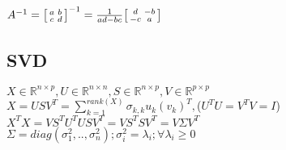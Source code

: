 $A^{-1}=
\begin{bsmallmatrix}
a&b \\ 
c&d
\end{bsmallmatrix}^{-1}=\frac{1}{ad-bc}
\begin{bsmallmatrix}
d&-b \\ 
-c&a
\end{bsmallmatrix}
$

\subsection*{SVD}
$X\in \mathbb{R}^{n\times p}, U\in \mathbb{R}^{n\times n}, S\in \mathbb{R}^{n\times p},
V\in \mathbb{R}^{p\times p}$\\
$X=USV^T=\sum_{k=1}^{rank(X)}\sigma_{k,k}u_k (v_k)^T,\!${\tiny{($U^TU=V^TV=I$)}}\\
$X^TX=VS^TU^TUSV^T=VS^TSV^T=V\Sigma V^T$\\
$\Sigma = diag(\sigma_1^2,..,\sigma_n^2);\sigma_i^2=\lambda_i; \forall \lambda_i \geq 0$

